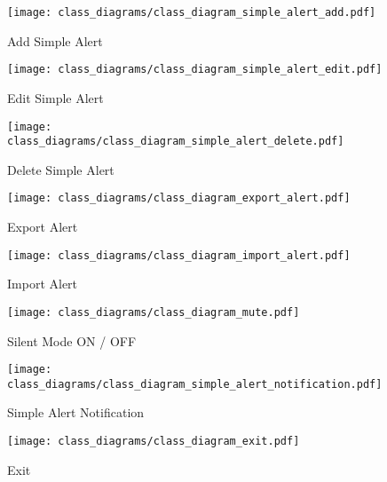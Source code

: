 \begin{figure}[]
	\centering
    \caption{Add Simple Alert}\label{fig:cls_simple_alert_add}
    \texttt{[image: class\_diagrams/class\_diagram\_simple\_alert\_add.pdf]}
\end{figure}

\begin{figure}[]
	\centering
    \caption{Edit Simple Alert}\label{fig:cls_simple_alert_edit}
    \texttt{[image: class\_diagrams/class\_diagram\_simple\_alert\_edit.pdf]}
\end{figure}

\begin{figure}[]
	\centering
    \caption{Delete Simple Alert}\label{fig:cls_simple_alert_delete}
    \texttt{[image: class\_diagrams/class\_diagram\_simple\_alert\_delete.pdf]}
\end{figure}

\begin{figure}[]
	\centering
    \caption{Export Alert}\label{fig:cls_export_alert}
    \texttt{[image: class\_diagrams/class\_diagram\_export\_alert.pdf]}
\end{figure}

\begin{figure}[]
	\centering
    \caption{Import Alert}\label{fig:cls_import_alert}
    \texttt{[image: class\_diagrams/class\_diagram\_import\_alert.pdf]}
\end{figure}

\begin{figure}[]
	\centering
    \caption{Silent Mode ON / OFF}\label{fig:cls_silent_mode}
    \texttt{[image: class\_diagrams/class\_diagram\_mute.pdf]}
\end{figure}

\begin{figure}[]
	\centering
    \caption{Simple Alert Notification}\label{fig:cls_simple_alert_notification}
    \texttt{[image: class\_diagrams/class\_diagram\_simple\_alert\_notification.pdf]}
\end{figure}

\begin{figure}[]
	\centering
    \caption{Exit}\label{fig:cls_exit}
    \texttt{[image: class\_diagrams/class\_diagram\_exit.pdf]}
\end{figure}
